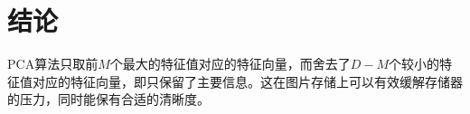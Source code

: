 \section{结论}

PCA算法只取前$M$个最大的特征值对应的特征向量，而舍去了$D-M$个较小的特征值对应的特征向量，即只保留了主要信息。这在图片存储上可以有效缓解存储器的压力，同时能保有合适的清晰度。